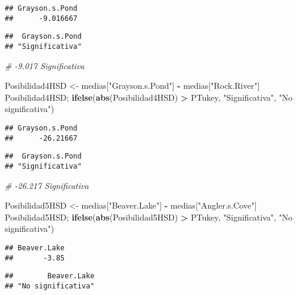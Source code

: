 \documentclass[
]{article}
\newenvironment{Shaded}{\begin{snugshade}}{\end{snugshade}}
\newcommand{\CommentTok}[1]{\textcolor[rgb]{0.56,0.35,0.01}{\textit{#1}}}
\newcommand{\FunctionTok}[1]{\textcolor[rgb]{0.13,0.29,0.53}{\textbf{#1}}}
\newcommand{\NormalTok}[1]{#1}
\newcommand{\OtherTok}[1]{\textcolor[rgb]{0.56,0.35,0.01}{#1}}
\newcommand{\SpecialCharTok}[1]{\textcolor[rgb]{0.81,0.36,0.00}{\textbf{#1}}}
\newcommand{\StringTok}[1]{\textcolor[rgb]{0.31,0.60,0.02}{#1}}
\begin{document}
\begin{verbatim}
## Grayson.s.Pond 
##      -9.016667
\end{verbatim}

\begin{verbatim}
##  Grayson.s.Pond 
## "Significativa"
\end{verbatim}

\begin{Shaded}
\begin{Highlighting}[]
\CommentTok{\# {-}9.017 Significativa}

\NormalTok{Posibilidad4HSD }\OtherTok{\textless{}{-}}\NormalTok{ medias[}\StringTok{"Grayson.s.Pond"}\NormalTok{] }\SpecialCharTok{{-}}\NormalTok{ medias[}\StringTok{"Rock.River"}\NormalTok{]}
\NormalTok{Posibilidad4HSD; }\FunctionTok{ifelse}\NormalTok{(}\FunctionTok{abs}\NormalTok{(Posibilidad4HSD) }\SpecialCharTok{\textgreater{}}\NormalTok{ PTukey, }\StringTok{"Significativa"}\NormalTok{, }\StringTok{"No significativa"}\NormalTok{)}
\end{Highlighting}
\end{Shaded}

\begin{verbatim}
## Grayson.s.Pond 
##      -26.21667
\end{verbatim}

\begin{verbatim}
##  Grayson.s.Pond 
## "Significativa"
\end{verbatim}

\begin{Shaded}
\begin{Highlighting}[]
\CommentTok{\# {-}26.217 Significativa}

\NormalTok{Posibilidad5HSD }\OtherTok{\textless{}{-}}\NormalTok{ medias[}\StringTok{"Beaver.Lake"}\NormalTok{] }\SpecialCharTok{{-}}\NormalTok{ medias[}\StringTok{"Angler.s.Cove"}\NormalTok{]}
\NormalTok{Posibilidad5HSD; }\FunctionTok{ifelse}\NormalTok{(}\FunctionTok{abs}\NormalTok{(Posibilidad5HSD) }\SpecialCharTok{\textgreater{}}\NormalTok{ PTukey, }\StringTok{"Significativa"}\NormalTok{, }\StringTok{"No significativa"}\NormalTok{)}
\end{Highlighting}
\end{Shaded}

\begin{verbatim}
## Beaver.Lake 
##       -3.85
\end{verbatim}

\begin{verbatim}
##        Beaver.Lake 
## "No significativa"
\end{verbatim}
\end{document}
